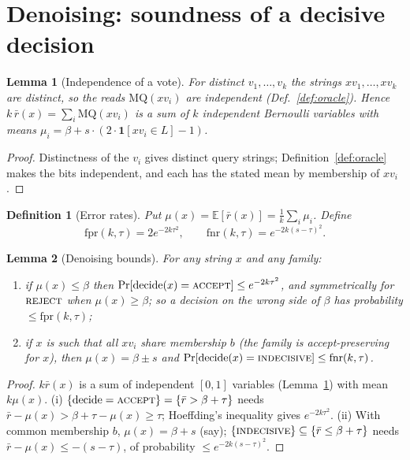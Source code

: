 \documentclass[11pt]{article}
\newtheorem{lemma}{Lemma}
\newtheorem{definition}{Definition}
\newcommand{\MQ}{\mathrm{MQ}}
\newcommand{\acc}{\textsc{accept}}
\newcommand{\rej}{\textsc{reject}}
\newcommand{\ind}{\textsc{indecisive}}
\newcommand{\fpr}{\mathrm{fpr}}
\newcommand{\fnr}{\mathrm{fnr}}
\begin{document}
\section{Denoising: soundness of a decisive decision}\label{sec:denoise}

\begin{lemma}[Independence of a vote]\label{lem:indep}
For distinct $v_1,\dots,v_k$ the strings $x v_1,\dots,x v_k$ are distinct, so the
reads $\MQ(x v_i)$ are independent (Def.~\ref{def:oracle}). Hence
$k\,\bar r(x)=\sum_i \MQ(x v_i)$ is a sum of $k$ independent Bernoulli variables
with means $\mu_i=\beta+s\cdot(2\cdot\mathbf 1[x v_i\in L]-1)$.
\end{lemma}
\begin{proof}
Distinctness of the $v_i$ gives distinct query strings; Definition~\ref{def:oracle}
makes the bits independent, and each has the stated mean by membership of $x v_i$.
\end{proof}

\begin{definition}[Error rates]\label{def:rates}
Put $\mu(x)=\mathbb E[\bar r(x)]=\frac1k\sum_i\mu_i$. Define
\[
  \fpr(k,\tau)=2e^{-2k\tau^2},\qquad \fnr(k,\tau)=e^{-2k(s-\tau)^2}.
\]
\end{definition}

\begin{lemma}[Denoising bounds]\label{lem:tails}
For any string $x$ and any family:
\begin{enumerate}
\item[(i)] if $\mu(x)\le\beta$ then $\Pr[\mathrm{decide}(x)=\acc]\le e^{-2k\tau^2}$,
and symmetrically for $\rej$ when $\mu(x)\ge\beta$; so a decision on the wrong side
of $\beta$ has probability $\le\fpr(k,\tau)$;
\item[(ii)] if $x$ is such that all $x v_i$ share membership $b$ (the family is
accept-preserving for $x$), then $\mu(x)=\beta\pm s$ and
$\Pr[\mathrm{decide}(x)=\ind]\le\fnr(k,\tau)$.
\end{enumerate}
\end{lemma}
\begin{proof}
$k\bar r(x)$ is a sum of independent $[0,1]$ variables (Lemma~\ref{lem:indep}) with
mean $k\mu(x)$. (i) $\{\mathrm{decide}=\acc\}=\{\bar r>\beta+\tau\}$ needs
$\bar r-\mu(x)>\beta+\tau-\mu(x)\ge\tau$; Hoeffding's inequality gives
$e^{-2k\tau^2}$. (ii) With common membership $b$, $\mu(x)=\beta+s$ (say);
$\{\ind\}\subseteq\{\bar r\le\beta+\tau\}$ needs $\bar r-\mu(x)\le-(s-\tau)$, of
probability $\le e^{-2k(s-\tau)^2}$.
\end{proof}
\end{document}
